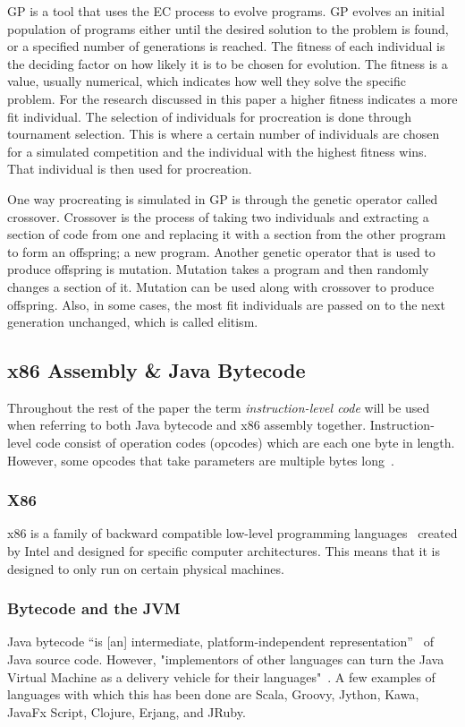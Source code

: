 \documentclass{sig-alternate}
\begin{document}
	GP is a tool that uses the EC process to evolve programs. GP evolves an initial population of programs either until the desired solution to the problem is found, or a specified number of generations is reached. The fitness of each individual is the deciding factor on how likely it is to be chosen for evolution. The fitness is a value, usually numerical, which indicates how well they solve the specific problem. For the research discussed in this paper a higher fitness indicates a more fit individual. The selection of individuals for procreation is done through tournament selection. This is where a certain number of individuals are chosen for a simulated competition and the individual with the highest fitness wins. That individual is then used for procreation.\par 	
	One way procreating is simulated in GP is through the genetic operator called crossover. Crossover is the process of taking two individuals and extracting a section of code from one and replacing it with a section from the other program to form an offspring; a new program. Another genetic operator that is used to produce offspring is mutation. Mutation takes a program and then randomly changes a section of it. Mutation can be used along with crossover to produce offspring. Also, in some cases, the most fit individuals are passed on to the next generation unchanged, which is called elitism.


\subsection{x86 Assembly \& Java Bytecode}
Throughout the rest of the paper the term \textit{instruction-level code} will be used when referring to both Java bytecode and x86 assembly together. Instruction-level code consist of operation codes (opcodes) which are each one byte in length. However, some opcodes that take parameters are multiple bytes long~\cite{JavaBytecode:2014,x86tomachine:2013}.

\subsubsection{X86}
x86 is a family of backward compatible low-level programming languages~\cite{x86assembly:2014} created by Intel and designed for specific computer architectures. This means that it is designed to only run on certain physical machines. 

\subsubsection{ Bytecode and the JVM}
Java bytecode ``is [an] intermediate, platform-independent representation''~\cite{FINCH2:2009} of Java source code. However, "implementors of other languages can turn the Java Virtual Machine as a delivery vehicle for their languages"~\cite{JVMspec:2013}. A few examples of languages with which this has been done are Scala, Groovy, Jython, Kawa, JavaFx Script, Clojure, Erjang, and JRuby.
\end{document}
